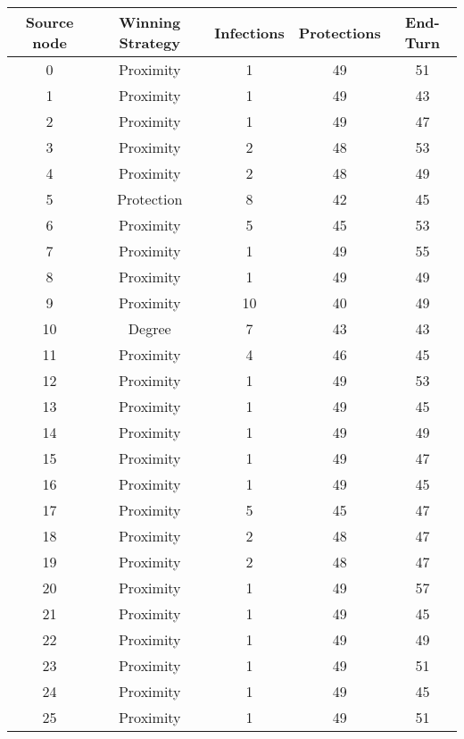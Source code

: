 \documentclass[results.tex]{subfiles}
\begin{document}
\begin{center}
  \begin{tabular}{| c || c | c | c | c |}
    \hline
    {\bfseries Source node} & {\bfseries Winning Strategy} & {\bfseries Infections} & {\bfseries Protections} & {\bfseries End-Turn} \\  %
    \hline\hline
    0 & Proximity & 1 & 49 & 51 \\ 
    \hline
    1 & Proximity & 1 & 49 & 43 \\ 
    \hline
    2 & Proximity & 1 & 49 & 47 \\ 
    \hline
    3 & Proximity & 2 & 48 & 53 \\ 
    \hline
    4 & Proximity & 2 & 48 & 49 \\ 
    \hline
    5 & Protection & 8 & 42 & 45 \\ 
    \hline
    6 & Proximity & 5 & 45 & 53 \\ 
    \hline
    7 & Proximity & 1 & 49 & 55 \\ 
    \hline
    8 & Proximity & 1 & 49 & 49 \\ 
    \hline
    9 & Proximity & 10 & 40 & 49 \\ 
    \hline
    10 & Degree & 7 & 43 & 43 \\ 
    \hline
    11 & Proximity & 4 & 46 & 45 \\ 
    \hline
    12 & Proximity & 1 & 49 & 53 \\ 
    \hline
    13 & Proximity & 1 & 49 & 45 \\ 
    \hline
    14 & Proximity & 1 & 49 & 49 \\ 
    \hline
    15 & Proximity & 1 & 49 & 47 \\ 
    \hline
    16 & Proximity & 1 & 49 & 45 \\ 
    \hline
    17 & Proximity & 5 & 45 & 47 \\ 
    \hline
    18 & Proximity & 2 & 48 & 47 \\ 
    \hline
    19 & Proximity & 2 & 48 & 47 \\ 
    \hline
    20 & Proximity & 1 & 49 & 57 \\ 
    \hline
    21 & Proximity & 1 & 49 & 45 \\ 
    \hline
    22 & Proximity & 1 & 49 & 49 \\ 
    \hline
    23 & Proximity & 1 & 49 & 51 \\ 
    \hline
    24 & Proximity & 1 & 49 & 45 \\ 
    \hline
    25 & Proximity & 1 & 49 & 51 \\ 

\end{tabular}
\end{center}
\end{document}
